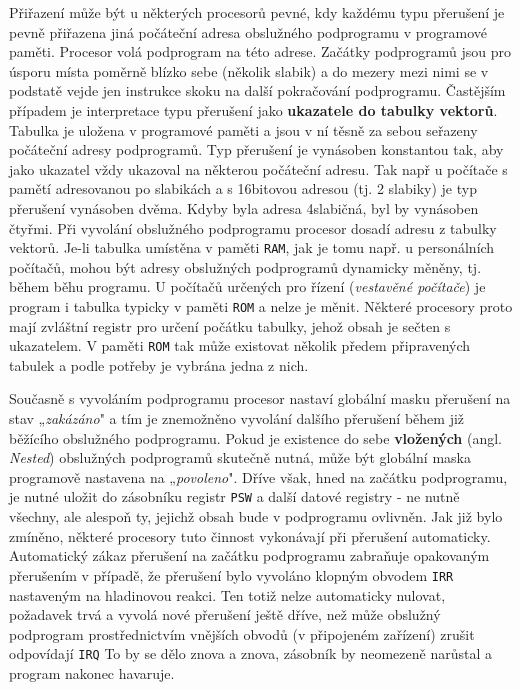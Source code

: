       Přiřazení může být u některých procesorů pevné, kdy každému typu přerušení je pevně přiřazena 
      jiná počáteční adresa obslužného podprogramu v programové paměti. Procesor volá podprogram na 
      této adrese. Začátky podprogramů jsou pro úsporu místa poměrně blízko sebe (několik slabik) a 
      do mezery mezi nimi se v podstatě vejde jen instrukce skoku na další pokračování podprogramu. 
      Častějším případem je interpretace typu přerušení jako \textbf{ukazatele do tabulky vektorů}. 
      Tabulka je uložena v programové paměti a jsou v ní těsně za sebou seřazeny počáteční adresy 
      podprogramů. Typ přerušení je vynásoben konstantou tak, aby jako ukazatel vždy ukazoval na 
      některou počáteční adresu. Tak např u počítače s pamětí adresovanou po slabikách a s 
      16bitovou adresou (tj. 2 slabiky) je typ přerušení vynásoben dvěma. Kdyby byla adresa 
      4slabičná, byl by vynásoben čtyřmi. Při vyvolání obslužného podprogramu procesor dosadí 
      adresu z tabulky vektorů. Je-li tabulka umístěna v paměti \texttt{RAM}, jak je tomu např. u 
      personálních počítačů, mohou být adresy obslužných podprogramů dynamicky měněny, tj. během 
      běhu programu. U počítačů určených pro řízení (\emph{vestavěné počítače}) je program i 
      tabulka typicky v paměti \texttt{ROM} a nelze je měnit. Některé procesory proto mají zvláštní 
      registr pro určení počátku tabulky, jehož obsah je sečten s ukazatelem. V paměti \texttt{ROM} 
      tak může existovat několik předem připravených tabulek a podle potřeby je vybrána jedna z 
      nich.
      
      Současně s vyvoláním podprogramu procesor nastaví globální masku přerušení na stav 
      „\emph{zakázáno}" a tím je znemožněno vyvolání dalšího přerušení během již běžícího 
      obslužného podprogramu. Pokud je existence do sebe \textbf{vložených} (angl. \emph{Nested}) 
      obslužných podprogramů skutečně nutná, může být globální maska programově nastavena na 
      „\emph{povoleno}". Dříve však, hned na začátku podprogramu, je nutné uložit do zásobníku 
      registr \texttt{PSW} a další datové registry - ne nutně všechny, ale alespoň ty, jejichž 
      obsah bude v podprogramu ovlivněn. Jak již bylo zmíněno, některé procesory tuto činnost 
      vykonávají při přerušení automaticky. Automatický zákaz přerušení na začátku podprogramu 
      zabraňuje opakovaným přerušením v případě, že přerušení bylo vyvoláno klopným obvodem 
      \texttt{IRR} nastaveným na hladinovou reakci. Ten totiž nelze automaticky nulovat, požadavek 
      trvá a vyvolá nové přerušení ještě dříve, než může obslužný podprogram prostřednictvím 
      vnějších obvodů (v připojeném zařízení) zrušit odpovídají \texttt{IRQ} To by se dělo znova a 
      znova, zásobník by neomezeně narůstal a program nakonec havaruje.
      
